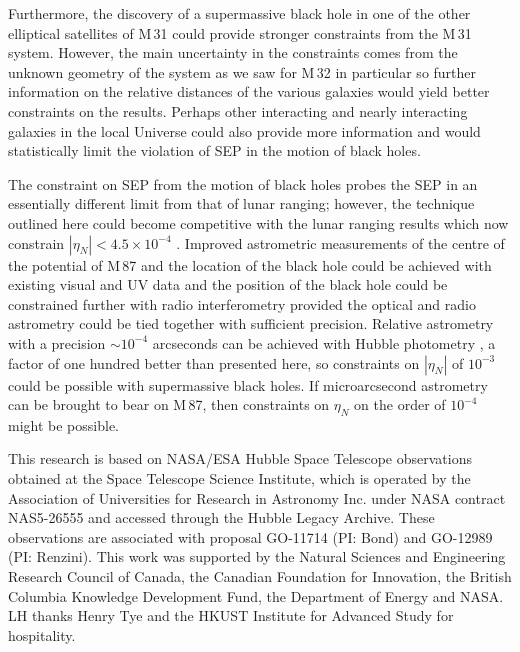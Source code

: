 \documentclass[useAMS,usenatbib]{mn2e}
\begin{document}
Furthermore, the discovery of a supermassive black hole in one of the
other elliptical satellites of M\,31 could provide stronger
constraints from the M\,31 system.  However, the main uncertainty in
the constraints comes from the unknown geometry of the system as we
saw for M\,32 in particular so further information on the relative
distances of the various galaxies would yield better constraints on
the results.  Perhaps other interacting and nearly interacting
galaxies in the local Universe could also provide more information and
would statistically limit the violation of SEP in the motion of black
holes.

The constraint on SEP from the motion of black holes probes the SEP 
in an essentially different limit 
from that of
lunar ranging; however, the
technique outlined here could become competitive with the lunar
ranging results which now constrain $|\eta_N|<4.5 \times 10^{-4}$
\citep{Baess:1999}.  Improved astrometric measurements of the centre
of the potential of M\,87 and the location of the black hole could be
achieved with existing visual and UV data and the position of the
black hole could be 
constrained 
further with radio 
interferometry 
provided
the optical and radio astrometry could be tied together with
sufficient precision.  Relative astrometry with a precision $\sim
10^{-4}$ arcseconds can be achieved with Hubble photometry
\citep[e.g.][]{Heyl116397dyn}, a factor of one hundred better than
presented here, so constraints on $|\eta_N|$ of $10^{-3}$ could be
possible with supermassive black holes.  If microarcsecond astrometry
can be brought to bear \citep[e.g.][]{2011ApJ...735...57B} on M\,87,
then 
constraints
on $\eta_N$ on the order of $10^{-4}$ might be possible.

This research is based on NASA/ESA Hubble Space Telescope observations
obtained at the Space Telescope Science Institute, which is operated
by the Association of Universities for Research in Astronomy
Inc. under NASA contract NAS5-26555 and accessed through the Hubble
Legacy Archive. These observations are associated with proposal
GO-11714 (PI: Bond) and GO-12989 (PI: Renzini).  This work was
supported by the Natural Sciences and Engineering Research Council of
Canada, the Canadian Foundation for Innovation, the British
Columbia Knowledge Development Fund, the Department of Energy
and NASA. LH thanks Henry Tye and the HKUST Institute for Advanced
Study for hospitality.





\label{lastpage}
\end{document}

